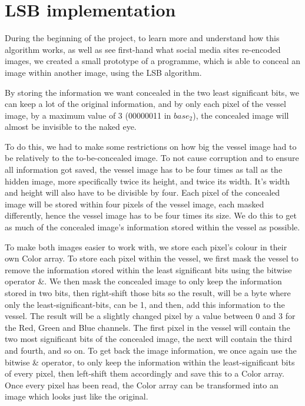 \section{LSB implementation}
During the beginning of the project, to learn more and understand how this algorithm works, as well as see first-hand what social media sites re-encoded images, we created a small prototype of a programme, which is able to conceal an image within another image, using the LSB algorithm. 

By storing the information we want concealed in the two least significant bits, we can keep a lot of the original information, and by only each pixel of the vessel image, by a maximum value of 3 (00000011 in $base_2$), the concealed image will almost be invisible to the naked eye.

To do this, we had to make some restrictions on how big the vessel image had to be relatively to the to-be-concealed image. To not cause corruption and to ensure all information got saved, the vessel image has to be four times as tall as the hidden image, more specifically twice its height, and twice its width. It's width and height will also have to be divisible by four. Each pixel of the concealed image will be stored within four pixels of the vessel image, each masked differently, hence the vessel image has to be four times its size. We do this to get as much of the concealed image's information stored within the vessel as possible.

To make both images easier to work with, we store each pixel's colour in their own Color array. To store each pixel within the vessel, we first mask the vessel to remove the information stored within the least significant bits using the bitwise operator \&. We then mask the concealed image to only keep the information stored in two bits, then right-shift those bits so the result, will be a byte where only the least-significant-bits, can be 1, and then, add this information to the vessel. The result will be a slightly changed pixel by a value between 0 and 3 for the Red, Green and Blue channels. The first pixel in the vessel will contain the two most significant bits of the concealed image, the next will contain the third and fourth, and so on. To get back the image information, we once again use the bitwise \& operator, to only keep the information within the least-significant bits of every pixel, then left-shift them accordingly and save this to a Color array. Once every pixel has been read, the Color array can be transformed into an image which looks just like the original.

